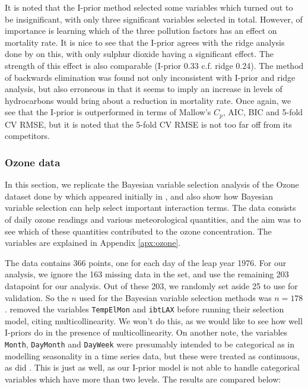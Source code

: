 \vspace{-4mm}
It is noted that the I-prior method selected some variables which turned out to be insignificant, with only three significant variables selected in total. However, of importance is learning which of the three pollution factors has an effect on mortality rate. It is nice to see that the I-prior agrees with the ridge analysis done by \citeauthor{McDonald1973} on this, with only sulphur dioxide having a significant effect. The strength of this effect is also comparable (I-prior 0.33 c.f. ridge 0.24). The method of backwards elimination was found not only inconsistent with I-prior and ridge analysis, but also erroneous in that it seems to imply an increase in levels of hydrocarbons would bring about a reduction in mortality rate. Once again, we see that the I-prior is outperformed in terms of Mallow's $C_p$, AIC, BIC and 5-fold CV RMSE, but it is noted that the 5-fold CV RMSE is not too far off from its competitors. 

\vspace{-2mm}
\subsubsection{Ozone data}
\label{sec:ozone}
\vspace{-1mm}

In this section, we replicate the Bayesian variable selection analysis of the Ozone dataset done by \cite{Casella2006} which appeared initially in \cite{Breiman1985}, and also show how Bayesian variable selection can help select important interaction terms. The data consists of daily ozone readings and various meteorological quantities, and the aim was to see which of these quantities contributed to the ozone concentration. The variables are explained in Appendix \ref{apx:ozone}. 

The data contains 366 points, one for each day of the leap year 1976. For our analysis, we ignore the 163 missing data in the set, and use the remaining 203 datapoint for our analysis. Out of these 203, we randomly set aside 25 to use for validation. So the $n$ used for the Bayesian variable selection methods was $n=178$. \citeauthor{Casella2006} removed the variables \texttt{TempElMon} and \texttt{ibtLAX} before running their selection model, citing multicollinearity. We won't do this, as we would like to see how well I-priors do in the presence of multicollinearity. On another note, the variables \texttt{Month}, \texttt{DayMonth} and \texttt{DayWeek} were presumably intended to be categorical as in modelling seasonality in a time series data, but these were treated as continuous, as did \citeauthor{Casella2006}. This is just as well, as our I-prior model is not able to handle categorical variables which have more than two levels. The results are compared below:


